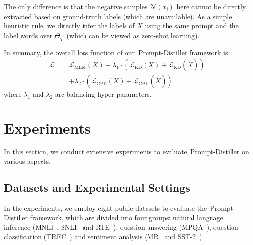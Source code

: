 \documentclass{article}
\begin{document}
The only difference is that the negative samples $\mathcal{N}(x_i)$ here cannot be directly extracted based on ground-truth labels (which are unavailable).
As a simple heuristic rule, we directly infer the labels of $\tilde{X}$ using the same prompt and the label words over $\Theta_{T^{'}}$ (which can be viewed as zero-shot learning).


In summary, the overall loss function of our~{Prompt-Distiller} framework is:
\begin{equation}
	\begin{split}
		\mathcal{L}= & \mathcal{L}_{\text{MLM}}(X)+\lambda_1\cdot(\mathcal{L}_{\text{KD}}(X)+\mathcal{L}_{\text{KD}}(\tilde{X})) \\
		             & +\lambda_2\cdot(\mathcal{L}_{\text{CPD}}(X)+\mathcal{L}_{\text{CPD}}(\tilde{X}))
	\end{split}
\end{equation}
where $\lambda_1$ and $\lambda_2$ are balancing hyper-parameters.












\section{Experiments}
In this section, we conduct extensive experiments to evaluate~{Prompt-Distiller} on various aspects.

\subsection{Datasets and Experimental Settings}

In the experiments, we employ eight public datasets to evaluate the~{Prompt-Distiller} framework, which are divided into four groups:
natural language inference (MNLI~\cite{DBLP:conf/naacl/WilliamsNB18}, SNLI~\cite{DBLP:conf/emnlp/BowmanAPM15} and RTE~\cite{DBLP:conf/semeval/DzikovskaNBLGBC13}),
question answering (MPQA~\cite{DBLP:conf/naacl/DengW15}),
question classification (TREC~\cite{DBLP:journals/nle/LiR06}) and
sentiment analysis (MR~\cite{DBLP:conf/acl/PangL05} and SST-2~\cite{DBLP:conf/emnlp/SocherPWCMNP13}).
\end{document}
